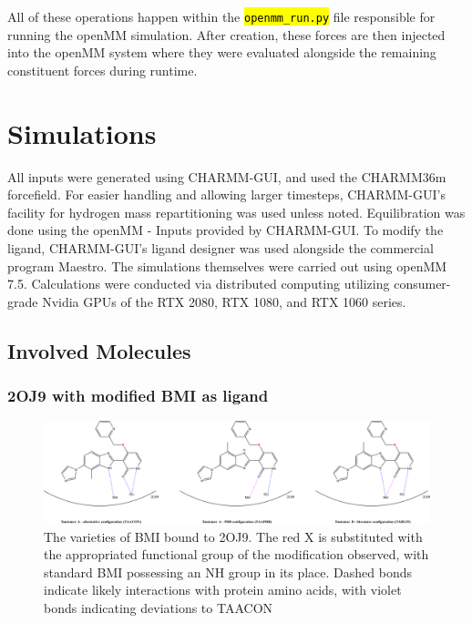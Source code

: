 \documentclass[oneside]{scrreprt}
\newcommand{\code}[1]{\texttt{\hl{#1}}}
\begin{document}
All of these operations happen within the \code{openmm\_run.py} file responsible for running the openMM simulation. After creation, these forces are then injected into the openMM system where they were evaluated alongside the remaining constituent forces during runtime.

\section{Simulations}\label{sec:simulations}

All inputs were generated using CHARMM-GUI\cite{Jo2008Aug}, and used the CHARMM36m forcefield\cite{Huang2017Jan}. For easier handling and allowing larger timesteps, CHARMM-GUI's facility for hydrogen mass repartitioning\cite{Gao2021Feb} was used unless noted. Equilibration was done using the openMM - Inputs provided by CHARMM-GUI\cite{Brooks2009Jul,Lee2016Jan}. To modify the ligand, CHARMM-GUI's ligand designer\cite{Guterres2021Nov} was used alongside the commercial program Maestro\cite{maestro}. The simulations themselves were carried out using openMM 7.5\cite{Eastman2017Jul}. Calculations were conducted via distributed computing utilizing consumer-grade Nvidia GPUs of the RTX 2080, RTX 1080, and RTX 1060 series.

\subsection{Involved Molecules}

\subsubsection{2OJ9 with modified BMI as ligand}
\begin{figure}[h]\label{fig:strucs_2oj9}
    \centering
    \includegraphics{2oj9_strucs.png}
    \caption[The varieties of BMI bound to 2OJ9] {The varieties of BMI bound to 2OJ9. The red X is substituted with the appropriated functional group of the modification observed, with standard BMI possessing an NH group in its place. Dashed bonds indicate likely interactions with protein amino acids, with violet bonds indicating deviations to TAACON}
    
\end{figure}
\end{document}
